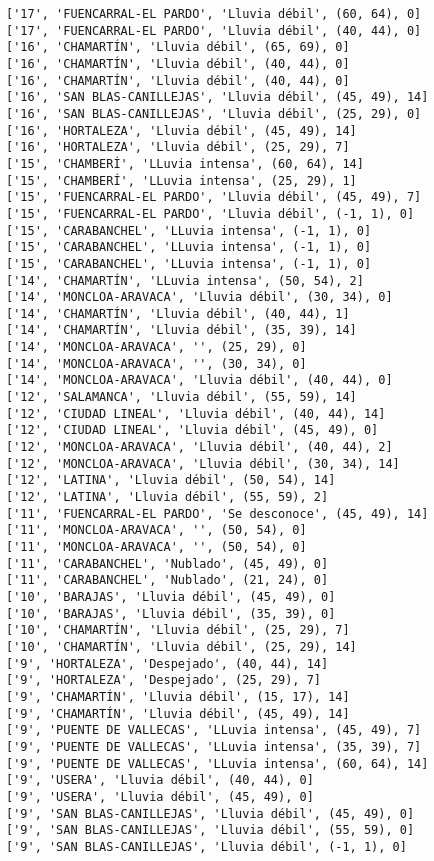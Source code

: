 \documentclass[11pt]{article}
\begin{document}
\begin{Verbatim}[commandchars=\\\{\}]
['17', 'FUENCARRAL-EL PARDO', 'Lluvia débil', (60, 64), 0]
['17', 'FUENCARRAL-EL PARDO', 'Lluvia débil', (40, 44), 0]
['16', 'CHAMARTÍN', 'Lluvia débil', (65, 69), 0]
['16', 'CHAMARTÍN', 'Lluvia débil', (40, 44), 0]
['16', 'CHAMARTÍN', 'Lluvia débil', (40, 44), 0]
['16', 'SAN BLAS-CANILLEJAS', 'Lluvia débil', (45, 49), 14]
['16', 'SAN BLAS-CANILLEJAS', 'Lluvia débil', (25, 29), 0]
['16', 'HORTALEZA', 'Lluvia débil', (45, 49), 14]
['16', 'HORTALEZA', 'Lluvia débil', (25, 29), 7]
['15', 'CHAMBERÍ', 'LLuvia intensa', (60, 64), 14]
['15', 'CHAMBERÍ', 'LLuvia intensa', (25, 29), 1]
['15', 'FUENCARRAL-EL PARDO', 'Lluvia débil', (45, 49), 7]
['15', 'FUENCARRAL-EL PARDO', 'Lluvia débil', (-1, 1), 0]
['15', 'CARABANCHEL', 'LLuvia intensa', (-1, 1), 0]
['15', 'CARABANCHEL', 'LLuvia intensa', (-1, 1), 0]
['15', 'CARABANCHEL', 'LLuvia intensa', (-1, 1), 0]
['14', 'CHAMARTÍN', 'LLuvia intensa', (50, 54), 2]
['14', 'MONCLOA-ARAVACA', 'Lluvia débil', (30, 34), 0]
['14', 'CHAMARTÍN', 'Lluvia débil', (40, 44), 1]
['14', 'CHAMARTÍN', 'Lluvia débil', (35, 39), 14]
['14', 'MONCLOA-ARAVACA', '', (25, 29), 0]
['14', 'MONCLOA-ARAVACA', '', (30, 34), 0]
['14', 'MONCLOA-ARAVACA', 'Lluvia débil', (40, 44), 0]
['12', 'SALAMANCA', 'Lluvia débil', (55, 59), 14]
['12', 'CIUDAD LINEAL', 'Lluvia débil', (40, 44), 14]
['12', 'CIUDAD LINEAL', 'Lluvia débil', (45, 49), 0]
['12', 'MONCLOA-ARAVACA', 'Lluvia débil', (40, 44), 2]
['12', 'MONCLOA-ARAVACA', 'Lluvia débil', (30, 34), 14]
['12', 'LATINA', 'Lluvia débil', (50, 54), 14]
['12', 'LATINA', 'Lluvia débil', (55, 59), 2]
['11', 'FUENCARRAL-EL PARDO', 'Se desconoce', (45, 49), 14]
['11', 'MONCLOA-ARAVACA', '', (50, 54), 0]
['11', 'MONCLOA-ARAVACA', '', (50, 54), 0]
['11', 'CARABANCHEL', 'Nublado', (45, 49), 0]
['11', 'CARABANCHEL', 'Nublado', (21, 24), 0]
['10', 'BARAJAS', 'Lluvia débil', (45, 49), 0]
['10', 'BARAJAS', 'Lluvia débil', (35, 39), 0]
['10', 'CHAMARTÍN', 'Lluvia débil', (25, 29), 7]
['10', 'CHAMARTÍN', 'Lluvia débil', (25, 29), 14]
['9', 'HORTALEZA', 'Despejado', (40, 44), 14]
['9', 'HORTALEZA', 'Despejado', (25, 29), 7]
['9', 'CHAMARTÍN', 'Lluvia débil', (15, 17), 14]
['9', 'CHAMARTÍN', 'Lluvia débil', (45, 49), 14]
['9', 'PUENTE DE VALLECAS', 'LLuvia intensa', (45, 49), 7]
['9', 'PUENTE DE VALLECAS', 'LLuvia intensa', (35, 39), 7]
['9', 'PUENTE DE VALLECAS', 'LLuvia intensa', (60, 64), 14]
['9', 'USERA', 'Lluvia débil', (40, 44), 0]
['9', 'USERA', 'Lluvia débil', (45, 49), 0]
['9', 'SAN BLAS-CANILLEJAS', 'Lluvia débil', (45, 49), 0]
['9', 'SAN BLAS-CANILLEJAS', 'Lluvia débil', (55, 59), 0]
['9', 'SAN BLAS-CANILLEJAS', 'Lluvia débil', (-1, 1), 0]

\end{Verbatim}
\end{document}
